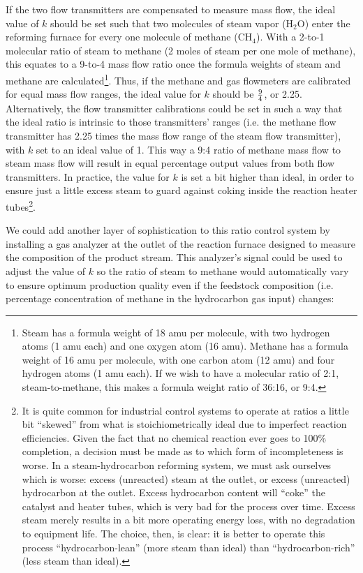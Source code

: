 If the two flow transmitters are compensated to measure mass flow, the ideal value of $k$ should be set such that two molecules of steam vapor (H$_{2}$O) enter the reforming furnace for every one molecule of methane (CH$_{4}$).  With a 2-to-1 molecular ratio of steam to methane (2 moles of steam per one mole of methane), this equates to a 9-to-4 mass flow ratio once the formula weights of steam and methane are calculated\footnote{Steam has a formula weight of 18 amu per molecule, with two hydrogen atoms (1 amu each) and one oxygen atom (16 amu).  Methane has a formula weight of 16 amu per molecule, with one carbon atom (12 amu) and four hydrogen atoms (1 amu each).  If we wish to have a molecular ratio of 2:1, steam-to-methane, this makes a formula weight ratio of 36:16, or 9:4.}.  Thus, if the methane and gas flowmeters are calibrated for equal mass flow ranges, the ideal value for $k$ should be ${9 \over 4}$, or 2.25.  Alternatively, the flow transmitter calibrations could be set in such a way that the ideal ratio is intrinsic to those transmitters' ranges (i.e. the methane flow transmitter has 2.25 times the mass flow range of the steam flow transmitter), with $k$ set to an ideal value of 1.  This way a 9:4 ratio of methane mass flow to steam mass flow will result in equal percentage output values from both flow transmitters.  In practice, the value for $k$ is set a bit higher than ideal, in order to ensure just a little excess steam to guard against coking inside the reaction heater tubes\footnote{It is quite common for industrial control systems to operate at ratios a little bit ``skewed'' from what is stoichiometrically ideal due to imperfect reaction efficiencies.  Given the fact that no chemical reaction ever goes to 100\% completion, a decision must be made as to which form of incompleteness is worse.  In a steam-hydrocarbon reforming system, we must ask ourselves which is worse: excess (unreacted) steam at the outlet, or excess (unreacted) hydrocarbon at the outlet.  Excess hydrocarbon content will ``coke'' the catalyst and heater tubes, which is very bad for the process over time.  Excess steam merely results in a bit more operating energy loss, with no degradation to equipment life.  The choice, then, is clear: it is better to operate this process ``hydrocarbon-lean'' (more steam than ideal) than ``hydrocarbon-rich'' (less steam than ideal).}.  

\filbreak

We could add another layer of sophistication to this ratio control system by installing a gas analyzer at the outlet of the reaction furnace designed to measure the composition of the product stream.  This analyzer's signal could be used to adjust the value of $k$ so the ratio of steam to methane would automatically vary to ensure optimum production quality even if the feedstock composition (i.e. percentage concentration of methane in the hydrocarbon gas input) changes:

